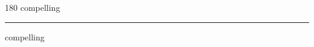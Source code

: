 
\begin{frame}
\begin{center}
\begin{turn}{180}
{\fontsize{2.5cm}{1em}\selectfont compelling}
\end{turn}
\vspace{1em}\par  
\hrule
\vspace{1em}\par  
{\fontsize{2.5cm}{1em}\selectfont compelling}
\end{center}
\end{frame}
